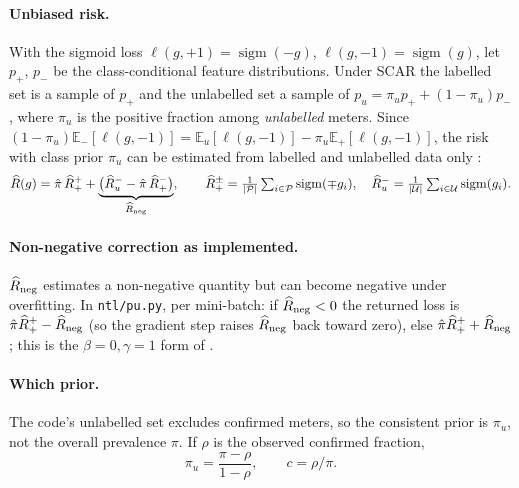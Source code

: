 \documentclass[11pt,a4paper]{article}
\theoremstyle{plain}
\theoremstyle{definition}
\theoremstyle{remark}
\newcommand{\E}{\mathbb{E}}
\newcommand{\sig}{\operatorname{sigm}}
\begin{document}
\paragraph{Unbiased risk.} With the sigmoid loss $\ell(g,+1)=\sig(-g)$, $\ell(g,-1)=\sig(g)$, let $p_+$, $p_-$ be the class-conditional feature distributions. Under SCAR the labelled set is a sample of $p_+$ and the unlabelled set a sample of $p_u=\pi_up_++(1-\pi_u)p_-$, where $\pi_u$ is the positive fraction among \emph{unlabelled} meters. Since $(1-\pi_u)\E_-[\ell(g,-1)]=\E_u[\ell(g,-1)]-\pi_u\E_+[\ell(g,-1)]$, the risk with class prior $\pi_u$ can be estimated from labelled and unlabelled data only \citep{kiryo2017}:
\begin{equation}
\widehat R(g)=\hat\pi\,\widehat R_+^{+}+\underbrace{\big(\widehat R_u^{-}-\hat\pi\,\widehat R_+^{-}\big)}_{\widehat R_{\rm neg}},\qquad
\widehat R_+^{\pm}=\tfrac1{|\mathcal P|}\textstyle\sum_{i\in\mathcal P}\sig(\mp g_i),\quad
\widehat R_u^{-}=\tfrac1{|\mathcal U|}\textstyle\sum_{i\in\mathcal U}\sig(g_i).
\end{equation}
\paragraph{Non-negative correction as implemented.} $\widehat R_{\rm neg}$ estimates a non-negative quantity but can become negative under overfitting. In \texttt{ntl/pu.py}, per mini-batch: if $\widehat R_{\rm neg}<0$ the returned loss is $\hat\pi\widehat R_+^+-\widehat R_{\rm neg}$ (so the gradient step raises $\widehat R_{\rm neg}$ back toward zero), else $\hat\pi\widehat R_+^++\widehat R_{\rm neg}$; this is the $\beta=0,\gamma=1$ form of \citet{kiryo2017}.

\paragraph{Which prior.} The code's unlabelled set excludes confirmed meters, so the consistent prior is $\pi_u$, not the overall prevalence $\pi$. If $\rho$ is the observed confirmed fraction,
\begin{equation}
\pi_u=\frac{\pi-\rho}{1-\rho},\qquad c=\rho/\pi .
\label{eq:piu}
\end{equation}
\end{document}
